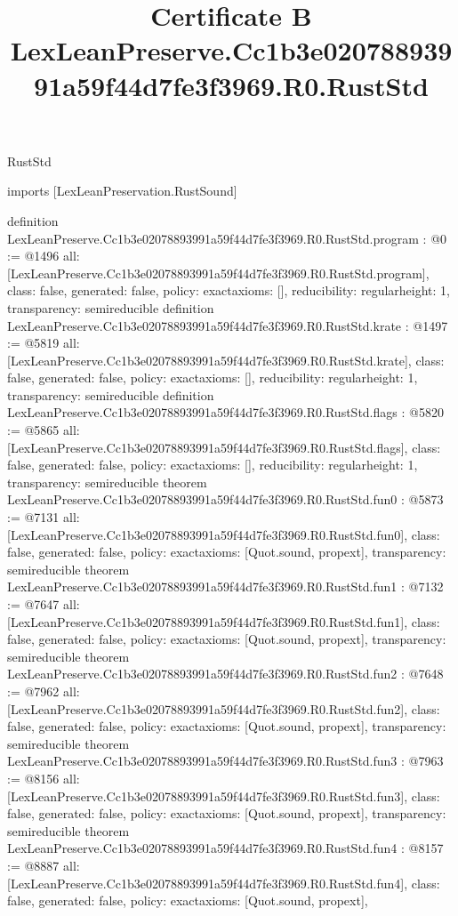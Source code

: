 \begin{lexlean}{RustStd}
\title{Certificate B LexLeanPreserve.Cc1b3e02078893991a59f44d7fe3f3969.R0.RustStd}
\begin{coremodule}
imports [LexLeanPreservation.RustSound]

definition LexLeanPreserve.Cc1b3e02078893991a59f44d7fe3f3969.R0.RustStd.program : @0 := @1496 {
  all: [LexLeanPreserve.Cc1b3e02078893991a59f44d7fe3f3969.R0.RustStd.program],
  class: false,
  generated: false,
  policy: exact{axioms: []},
  reducibility: regular{height: 1},
  transparency: semireducible
}
definition LexLeanPreserve.Cc1b3e02078893991a59f44d7fe3f3969.R0.RustStd.krate : @1497 := @5819 {
  all: [LexLeanPreserve.Cc1b3e02078893991a59f44d7fe3f3969.R0.RustStd.krate],
  class: false,
  generated: false,
  policy: exact{axioms: []},
  reducibility: regular{height: 1},
  transparency: semireducible
}
definition LexLeanPreserve.Cc1b3e02078893991a59f44d7fe3f3969.R0.RustStd.flags : @5820 := @5865 {
  all: [LexLeanPreserve.Cc1b3e02078893991a59f44d7fe3f3969.R0.RustStd.flags],
  class: false,
  generated: false,
  policy: exact{axioms: []},
  reducibility: regular{height: 1},
  transparency: semireducible
}
theorem LexLeanPreserve.Cc1b3e02078893991a59f44d7fe3f3969.R0.RustStd.fun0 : @5873 := @7131 {
  all: [LexLeanPreserve.Cc1b3e02078893991a59f44d7fe3f3969.R0.RustStd.fun0],
  class: false,
  generated: false,
  policy: exact{axioms: [Quot.sound, propext]},
  transparency: semireducible
}
theorem LexLeanPreserve.Cc1b3e02078893991a59f44d7fe3f3969.R0.RustStd.fun1 : @7132 := @7647 {
  all: [LexLeanPreserve.Cc1b3e02078893991a59f44d7fe3f3969.R0.RustStd.fun1],
  class: false,
  generated: false,
  policy: exact{axioms: [Quot.sound, propext]},
  transparency: semireducible
}
theorem LexLeanPreserve.Cc1b3e02078893991a59f44d7fe3f3969.R0.RustStd.fun2 : @7648 := @7962 {
  all: [LexLeanPreserve.Cc1b3e02078893991a59f44d7fe3f3969.R0.RustStd.fun2],
  class: false,
  generated: false,
  policy: exact{axioms: [Quot.sound, propext]},
  transparency: semireducible
}
theorem LexLeanPreserve.Cc1b3e02078893991a59f44d7fe3f3969.R0.RustStd.fun3 : @7963 := @8156 {
  all: [LexLeanPreserve.Cc1b3e02078893991a59f44d7fe3f3969.R0.RustStd.fun3],
  class: false,
  generated: false,
  policy: exact{axioms: [Quot.sound, propext]},
  transparency: semireducible
}
theorem LexLeanPreserve.Cc1b3e02078893991a59f44d7fe3f3969.R0.RustStd.fun4 : @8157 := @8887 {
  all: [LexLeanPreserve.Cc1b3e02078893991a59f44d7fe3f3969.R0.RustStd.fun4],
  class: false,
  generated: false,
  policy: exact{axioms: [Quot.sound, propext]},
}
\end{coremodule}
\end{lexlean}
